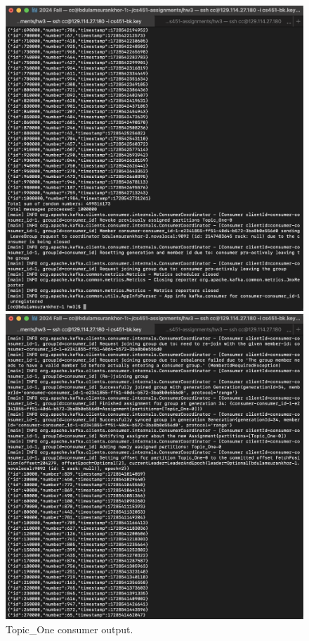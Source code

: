 \documentclass{article}
\begin{document}
\begin{enumerate}
\begin{enumerate}
    \begin{figure}[H]
      \centering
      \begin{minipage}{0.45\textwidth}
        \centering
        \includegraphics[width=1\textwidth]{image11.png}
        \caption{Topic\_One consumer output.}
      \end{minipage}
      \begin{minipage}{0.45\textwidth}
        \centering
        \includegraphics[width=1\textwidth]{image12.png}

\end{minipage}
\end{figure}
\end{enumerate}
\end{enumerate}
\end{document}
